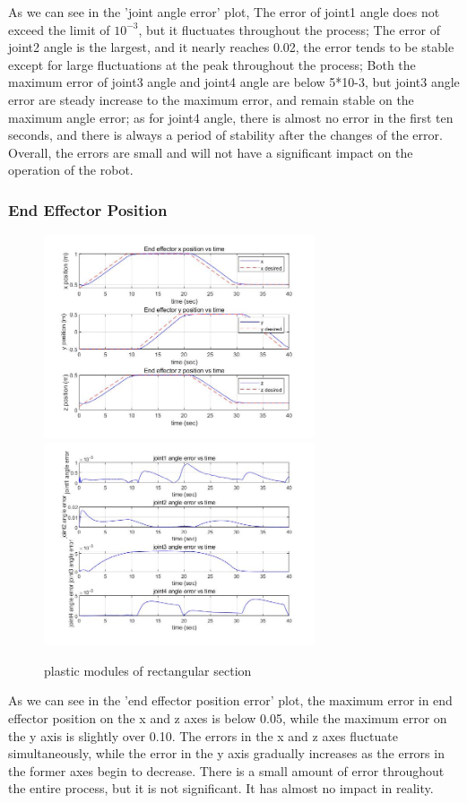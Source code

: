 As we can see in the 'joint angle error' plot, 
The error of joint1 angle does not exceed the limit of $10^{-3}$, but it fluctuates throughout the process;
The error of joint2 angle is the largest, and it nearly reaches 0.02, the error tends to be stable except for large fluctuations at the peak throughout the process;
Both the maximum error of joint3 angle and joint4 angle are below 5*10-3, but joint3 angle error are steady increase to the maximum error, and remain stable on the maximum angle error; as for joint4 angle, there is almost no error in the first ten seconds, and there is always a period of stability after the changes of the error.
Overall, the errors are small and will not have a significant impact on the operation of the robot.




\subsubsection*{End Effector Position}

\begin{figure}[htbp]
    \centering
    \includegraphics[width=8cm]{./fig/5.jpg}
    \includegraphics[width=8cm]{./fig/7.jpg}
    \caption{plastic modules of rectangular section}
    \label{f1}
\end{figure}

As we can see in the 'end effector position error' plot, the maximum error in end effector position on the x and z axes is below 0.05, while the maximum error on the y axis is slightly over 0.10. The errors in the x and z axes fluctuate simultaneously, while the error in the y axis gradually increases as the errors in the former axes begin to decrease. There is a small amount of error throughout the entire process, but it is not significant. It has almost no impact in reality.